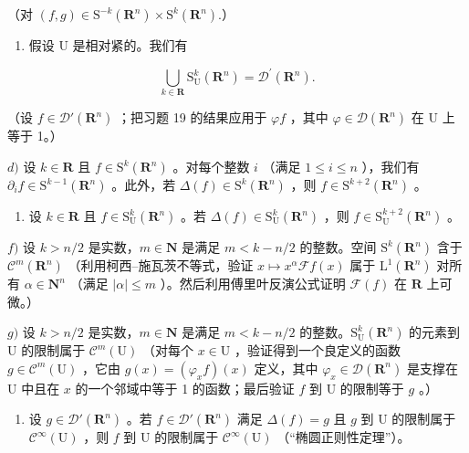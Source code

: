 （对 \((f,g)\in \mathrm{S}^{-k}(\mathbf{R}^n)\times \mathrm{S}^k (\mathbf{R}^n).\)）

\begin{enumerate}
\def\labelenumi{\alph{enumi})}
\setcounter{enumi}{2}
\tightlist
\item
  假设 U 是相对紧的。我们有
\end{enumerate}

\[
\bigcup_ {k \in \mathbf {R}} \mathrm{S} _ {\mathrm{U}} ^ {k} (\mathbf {R} ^ {n}) = \mathcal {D} ^ {\prime} (\mathbf {R} ^ {n}).
\]

（设 \(f \in \mathcal{D}'(\mathbf{R}^n)\) ；把习题 19 的结果应用于 \(\varphi f\) ，其中 \(\varphi \in \mathcal{D}(\mathbf{R}^n)\) 在 U 上等于 1。）

\(d)\) 设 \(k \in \mathbf{R}\) 且 \(f \in \mathrm{S}^k(\mathbf{R}^n)\) 。对每个整数 \(i\) （满足 \(1 \leqslant i \leqslant n\) ），我们有 \(\partial_i f \in \mathrm{S}^{k-1}(\mathbf{R}^n)\) 。此外，若 \(\Delta(f) \in \mathrm{S}^k(\mathbf{R}^n)\) ，则 \(f \in \mathrm{S}^{k+2}(\mathbf{R}^n)\) 。

\begin{enumerate}
\def\labelenumi{\alph{enumi})}
\setcounter{enumi}{4}
\tightlist
\item
  设 \(k \in \mathbf{R}\) 且 \(f \in \mathrm{S}_{\mathrm{U}}^{k}(\mathbf{R}^{n})\) 。若 \(\Delta(f) \in \mathrm{S}_{\mathrm{U}}^{k}(\mathbf{R}^{n})\) ，则 \(f \in \mathrm{S}_{\mathrm{U}}^{k+2}(\mathbf{R}^{n})\) 。
\end{enumerate}

\(f)\) 设 \(k > n/2\) 是实数，\(m \in \mathbf{N}\) 是满足 \(m < k - n/2\) 的整数。空间 \(\mathrm{S}^k(\mathbf{R}^n)\) 含于 \(\mathcal{C}^m(\mathbf{R}^n)\) （利用柯西–施瓦茨不等式，验证 \(x \mapsto x^\alpha \mathscr{F} f(x)\) 属于 \(\mathrm{L}^1(\mathbf{R}^n)\) 对所有 \(\alpha \in \mathbf{N}^n\) （满足 \(|\alpha| \leqslant m\) ）。然后利用傅里叶反演公式证明 \(\mathscr{F}(f)\) 在 \(\mathbf{R}\) 上可微。）

\(g)\) 设 \(k > n/2\) 是实数，\(m \in \mathbf{N}\) 是满足 \(m < k - n/2\) 的整数。\(\mathrm{S}_{\mathrm{U}}^{k}(\mathbf{R}^{n})\) 的元素到 U 的限制属于 \(\mathcal{C}^{m}(\mathrm{U})\) （对每个 \(x \in \mathrm{U}\) ，验证得到一个良定义的函数 \(g \in \mathcal{C}^{m}(\mathrm{U})\) ，它由 \(g(x) = (\varphi_{x}f)(x)\) 定义，其中 \(\varphi_{x} \in \mathcal{D}(\mathbf{R}^{n})\) 是支撑在 U 中且在 \(x\) 的一个邻域中等于 1 的函数；最后验证 \(f\) 到 U 的限制等于 \(g\) 。）

\begin{enumerate}
\def\labelenumi{\alph{enumi})}
\setcounter{enumi}{7}
\tightlist
\item
  设 \(g \in \mathcal{D}'(\mathbf{R}^n)\) 。若 \(f \in \mathcal{D}'(\mathbf{R}^n)\) 满足 \(\Delta(f) = g\) 且 \(g\) 到 U 的限制属于 \(\mathcal{C}^\infty(\mathrm{U})\) ，则 \(f\) 到 U 的限制属于 \(\mathcal{C}^\infty(\mathrm{U})\) （“椭圆正则性定理”）。
\end{enumerate}

